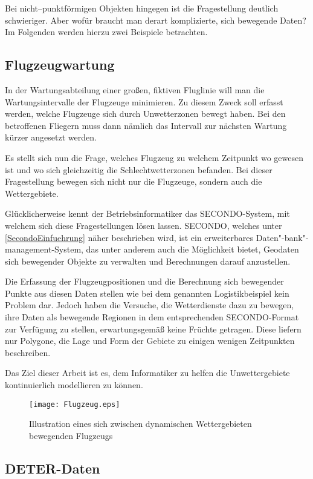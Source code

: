 Bei nicht--punktförmigen Objekten hingegen ist die Fragestellung deutlich schwieriger. Aber wofür braucht man derart komplizierte, sich bewegende Daten? Im Folgenden werden hierzu zwei Beispiele betrachten.

\subsection*{Flugzeugwartung}

In der Wartungsabteilung einer großen, fiktiven Fluglinie will man die Wartungsintervalle der Flugzeuge minimieren. Zu diesem Zweck soll erfasst werden, welche Flugzeuge sich durch Unwetterzonen bewegt haben. Bei den betroffenen Fliegern muss dann nämlich das Intervall zur nächsten Wartung kürzer angesetzt werden. 

Es stellt sich nun die Frage, welches Flugzeug zu welchem Zeitpunkt wo gewesen ist und wo sich gleichzeitig die Schlechtwetterzonen befanden. Bei dieser Fragestellung bewegen sich nicht nur die Flugzeuge, sondern auch die Wettergebiete.

Glücklicherweise kennt der Betriebsinformatiker das SECONDO-System, mit welchem sich diese Fragestellungen lösen lassen. SECONDO, welches unter \vref{SecondoEinfuehrung} näher beschrieben wird, ist ein erweiterbares Daten"-bank"-management-System, das unter anderem auch die Möglichkeit bietet, Geodaten sich bewegender Objekte zu verwalten und Berechnungen darauf anzustellen.

Die Erfassung der Flugzeugpositionen und die Berechnung sich bewegender Punkte aus diesen Daten stellen wie bei dem genannten Logistikbeispiel kein Problem dar. Jedoch haben die Versuche, die Wetterdienste dazu zu bewegen, ihre Daten als bewegende Regionen in dem entsprechenden SECONDO-Format zur Verfügung zu stellen, erwartungsgemäß keine Früchte getragen. Diese liefern nur  Polygone, die Lage und Form der Gebiete zu einigen wenigen Zeitpunkten beschreiben.

Das Ziel dieser Arbeit ist es, dem  Informatiker zu helfen die Unwettergebiete kontinuierlich modellieren zu können.

\begin{figure}
	\centering
	\texttt{[image: Flugzeug.eps]}
	\caption[Flugzeug zwischen Wettergebieten]{Illustration eines sich zwischen dynamischen Wettergebieten bewegenden Flugzeugs}
	\label{fig:Flugzeug}
\end{figure}


\subsection*{DETER-Daten}

